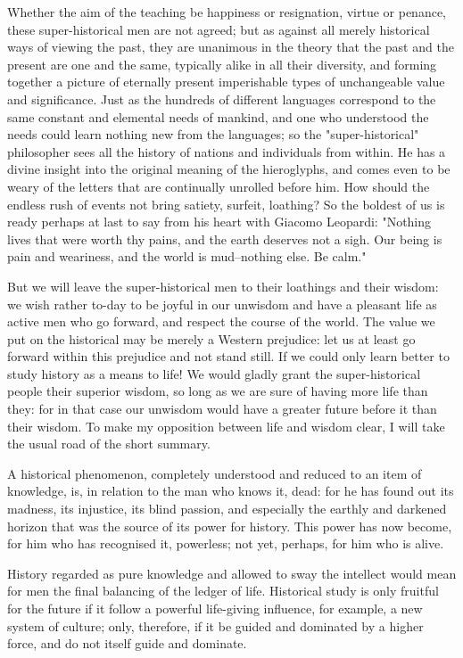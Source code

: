 Whether the aim of the teaching be happiness or resignation, virtue
or penance, these super-historical men are not agreed; but as against
all merely historical ways of viewing the past, they are unanimous in
the theory that the past and the present are one and the same,
typically alike in all their diversity, and forming together a
picture of eternally present imperishable types of unchangeable value
and significance. Just as the hundreds of different languages
correspond to the same constant and elemental needs of mankind, and
one who understood the needs could learn nothing new from the
languages; so the "super-historical" philosopher sees all the history
of nations and individuals from within. He has a divine insight into
the original meaning of the hieroglyphs, and comes even to be weary
of the letters that are continually unrolled before him. How should
the endless rush of events not bring satiety, surfeit, loathing? So
the boldest of us is ready perhaps at last to say from his heart with
Giacomo Leopardi: "Nothing lives that were worth thy pains, and the
earth deserves not a sigh. Our being is pain and weariness, and the
world is mud--nothing else. Be calm."

But we will leave the super-historical men to their loathings and
their wisdom: we wish rather to-day to be joyful in our unwisdom and
have a pleasant life as active men who go forward, and respect the
course of the world. The value we put on the historical may be merely
a Western prejudice: let us at least go forward within this prejudice
and not stand still. If we could only learn better to study history
as a means to life! We would gladly grant the super-historical people
their superior wisdom, so long as we are sure of having more life
than they: for in that case our unwisdom would have a greater future
before it than their wisdom. To make my opposition between life and
wisdom clear, I will take the usual road of the short summary.

A historical phenomenon, completely understood and reduced to an item
of knowledge, is, in relation to the man who knows it, dead: for he
has found out its madness, its injustice, its blind passion, and
especially the earthly and darkened horizon that was the source of
its power for history. This power has now become, for him who has
recognised it, powerless; not yet, perhaps, for him who is alive.

History regarded as pure knowledge and allowed to sway the intellect
would mean for men the final balancing of the ledger of life.
Historical study is only fruitful for the future if it follow a
powerful life-giving influence, for example, a new system of culture;
only, therefore, if it be guided and dominated by a higher force, and
do not itself guide and dominate.

